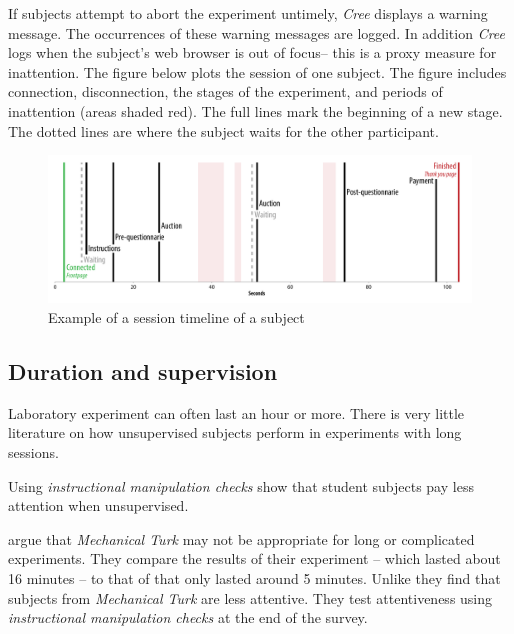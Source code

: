 \documentclass[preprint, 12pt]{elsarticle}
\newcommand{\Cree}{\emph{Cree}\xspace}
\begin{document}
If subjects attempt to abort the experiment untimely, \Cree displays a warning message. The occurrences of these warning messages are logged. In addition \Cree logs when the subject's web browser is out of focus\footnotemark[7] -- this is a proxy measure for inattention. The figure below plots the session of one subject. The figure includes connection, disconnection, the stages of the experiment, and periods of inattention (areas shaded red). The full lines mark the beginning of a new stage. The dotted lines are where the subject waits for the other participant.

\begin{figure}[h!]
  \caption{Example of a session timeline of a subject}
  \centering
    \includegraphics[width=\textwidth]{figures/example_session}
\end{figure}


\subsection{Duration and supervision}

Laboratory experiment can often last an hour or more. There is very little literature on how unsupervised subjects perform in  experiments with long sessions. 

Using \emph{instructional manipulation checks} \citet*{Oppenheimer_Meyvis_Davidenko_2009} show that student subjects pay less attention when unsupervised.

\cite{Goodman_Cryder_Cheema_2013} argue that \emph{Mechanical Turk} may not be appropriate for long or complicated experiments. They compare the results of their experiment -- which lasted about 16 minutes -- to that of \citet*{Paolacci_Chandler_Ipeirotis_2010} that only lasted around 5 minutes. Unlike \cite{Paolacci_Chandler_Ipeirotis_2010} they find that subjects from \emph{Mechanical Turk} are less attentive. They test attentiveness using \emph{instructional manipulation checks} at the end of the survey.
\end{document}
